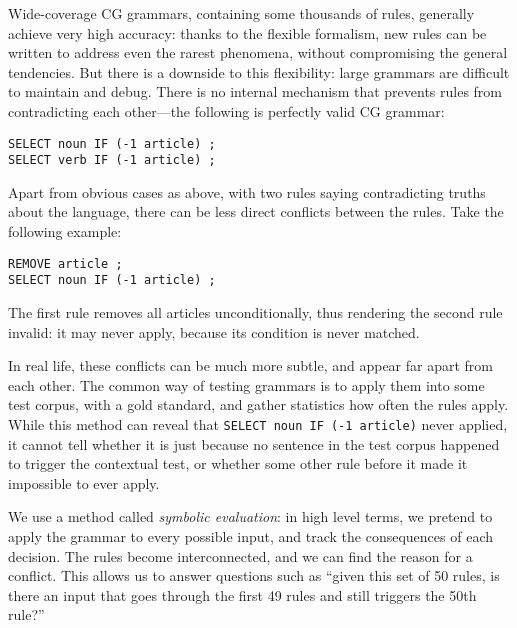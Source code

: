 Wide-coverage CG grammars, containing some thousands of rules, 
generally achieve very high accuracy: 
thanks to the flexible formalism, new rules can be written 
to address even the rarest phenomena, without compromising the general tendencies.
But there is a downside to this flexibility: large grammars are difficult to maintain
and debug. There is no internal mechanism that prevents rules from contradicting 
each other---the following is perfectly valid CG grammar:

\begin{verbatim}
SELECT noun IF (-1 article) ;
SELECT verb IF (-1 article) ;
\end{verbatim}

Apart from obvious cases as above, with two rules saying contradicting truths about the language, there can be less direct conflicts between the rules. Take the following example:

\begin{verbatim}
REMOVE article ;
SELECT noun IF (-1 article) ;
\end{verbatim}

The first rule removes all articles unconditionally, thus rendering the second rule invalid: it may never apply, because its condition is never matched. 

In real life, these conflicts can be much more subtle, and appear far apart from each other. %
The common way of testing grammars is to apply them into some test corpus, with a gold standard, and gather statistics how often the rules apply. While this method can reveal that \texttt{SELECT noun IF (-1 article)} never applied, it cannot tell whether it is just because no sentence in the test corpus happened to trigger the contextual test, or whether some other rule before it made it impossible to ever apply. 

We use a method called \emph{symbolic evaluation}: in high level terms, we pretend to apply the grammar to every possible input, and track the consequences of each decision. 
The rules become interconnected, and we can find the reason for a conflict. This allows us to answer questions such as ``given this set of 50 rules, is there an input that goes through the first 49 rules and still triggers the 50th rule?''



